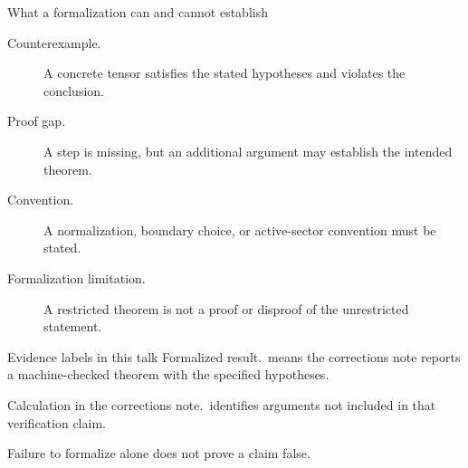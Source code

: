 \documentclass[aspectratio=169,14pt]{beamer}
\newcommand{\verified}{\textcolor{mintgreen}{Formalized result.}}
\newcommand{\calculated}{\textcolor{amber}{Calculation in the corrections note.}}
\begin{document}
\begin{frame}{What a formalization can and cannot establish}
\begin{description}
\item[Counterexample.] A concrete tensor satisfies the stated hypotheses and violates the conclusion.
\item[Proof gap.] A step is missing, but an additional argument may establish the intended theorem.
\item[Convention.] A normalization, boundary choice, or active-sector convention must be stated.
\item[Formalization limitation.] A restricted theorem is not a proof or disproof of the unrestricted statement.
\end{description}
\begin{block}{Evidence labels in this talk}
\verified\ means the corrections note reports a machine-checked theorem with the specified hypotheses.\par
\calculated\ identifies arguments not included in that verification claim.
\end{block}
\alert{Failure to formalize alone does not prove a claim false.}
\end{frame}
\end{document}
